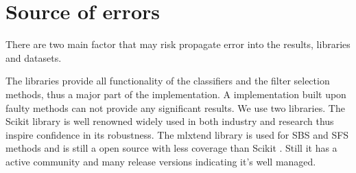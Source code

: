 \section{Source of errors}
\label{sec:source_of_errors}

There are two main factor that may risk propagate error into the results, libraries and datasets.

The libraries provide all functionality of the classifiers and the filter selection methods, thus a major part of the implementation. A implementation built upon faulty methods can not provide any significant results. We use two libraries. The Scikit library \parencite{scikit-learn} is well renowned widely used in both industry and research thus inspire confidence in its robustness. The mlxtend library is used for SBS and SFS methods and is still a open source with less coverage than Scikit \parencite{mlextend}. Still it has a active community and many release versions indicating it's well managed.

